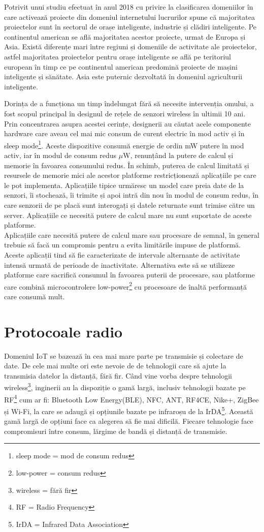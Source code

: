 \documentclass[12pt,a4paper]{report}
\begin{document}
Potrivit unui studiu efectuat în anul 2018 cu privire la clasificarea domeniilor în care activează proiecte din domeniul internetului lucrurilor spune că majoritatea proiectelor sunt în sectorul de orașe inteligente, industrie și clădiri inteligente\cite{study}. Pe continentul american se află majoritatea acestor proiecte, urmat de Europa și Asia. Există diferențe mari între regiuni și domeniile de activitate ale proiectelor, astfel majoritatea proiectelor pentru orașe inteligente se află pe teritoriul european în timp ce pe continentul american predomină proiecte de mașini inteligente și sănătate. Asia este puternic dezvoltată în domeniul agriculturii inteligente.

Dorința de a funcționa un timp îndelungat fără să necesite intervenția omului, a fost scopul principal în designul de rețele de senzori wireless în ultimii 10 ani\cite{lowpowervsperformance}. Prin concentrarea asupra acestei cerințe, designerii au căutat acele componente hardware care aveau cel mai mic consum de curent electric în mod activ și în sleep mode\footnote{sleep mode = mod de consum redus}. Aceste dispozitive consumă energie de ordin mW putere în mod activ, iar în modul de consum redus $\mu$W, renunțând la putere de calcul și memorie în favoarea consumului redus.
În schimb, puterea de calcul limitată și resursele de memorie mici ale acestor platforme restricționează aplicațiile pe care le pot implementa. Aplicațiile tipice urmăresc un model care preia date de la senzori, îi stochează, îi trimite și apoi intră din nou în modul de consum redus, în care senzorii de pe placă sunt interogați și datele returnate sunt trimise către un server. Aplicațiile ce necesită putere de calcul mare nu sunt suportate de aceste platforme. \\
Aplicațiile care necesită putere de calcul mare sau procesare de semnal, în general trebuie să facă un compromis pentru a evita limitările impuse de platformă. Aceste aplicații tind să fie caracterizate de intervale alternante de activitate intensă urmată de perioade de inactivitate. Alternativa este să se utilizeze platforme care sacrifică consumul în favoarea puterii de procesare, sau platforme care combină microcontrolere low-power\footnote{low-power = consum redus} cu procesoare de înaltă performanță care consumă mult.

\section{Protocoale radio}
Domeniul IoT se bazează în cea mai mare parte pe transmisie și colectare de date. De cele mai multe ori este nevoie de de tehnologii care să ajute la transmisia datelor la distanță, fără fir.
Când vine vorba despre tehnologii wireless\footnote{wireless = fără fir}, inginerii au la dispoziție o gamă largă, inclusiv tehnologii bazate pe RF\footnote{RF = Radio Frequency} cum ar fi: Bluetooth Low Energy(BLE), NFC, ANT, RF4CE, Nike+, ZigBee și Wi-Fi, la care se adaugă și opțiunile bazate pe infraroșu de la IrDA\footnote{IrDA = Infrared Data Association}\cite{comp1}. Această gamă largă de opțiuni face ca alegerea să fie mai dificilă. Fiecare tehnologie face compromisuri între consum, lărgime de bandă și distanță de transmisie.
\end{document}
